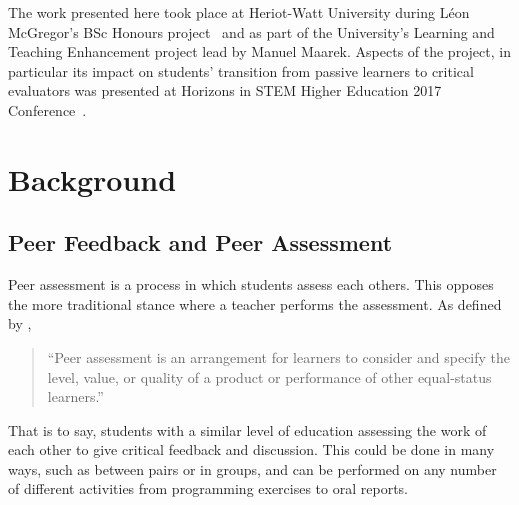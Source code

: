 \documentclass[sigplan,10pt,review]{acmart}\settopmatter{printfolios=true}
\begin{document}
The work presented here took place at Heriot-Watt University during
Léon McGregor's BSc Honours project~\cite{McGregor_BSc-2017} and as
part of the University's Learning and Teaching Enhancement project
lead by Manuel Maarek. Aspects of the project, in particular its
impact on students' transition from passive learners to critical
evaluators was presented at Horizons in STEM Higher Education 2017
Conference~\cite{GroHamKumMaaMcGrShaWelZan_STEM-HE-2017}.






\section{Background}
\label{sec:background}

\subsection{Peer Feedback and Peer Assessment}
\label{sec:background-peer-feedback}


Peer assessment is a process in which students assess each others. This
opposes the more traditional stance where a teacher performs the
assessment. As defined by \citet{topping_peer_2009},
\begin{quote}
  ``Peer assessment is an arrangement for learners to consider and
  specify the level, value, or quality of a product or performance of
  other equal-status learners.''
\end{quote}
That is to say, students with a similar level of education assessing
the work of each other to give critical feedback and discussion. This
could be done in many ways, such as between pairs or in groups, and
can be performed on any number of different activities from
programming exercises to oral reports.

\end{document}
